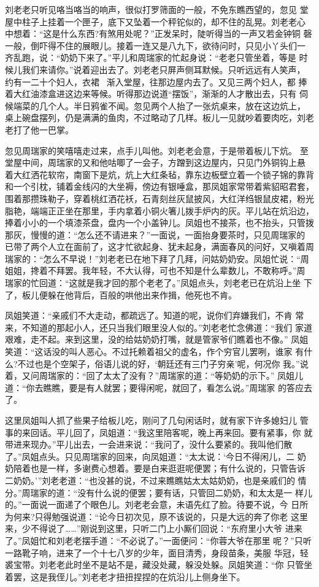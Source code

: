 刘老老只听见咯当咯当的响声，很似打罗筛面的一般，不免东瞧西望的，忽见
堂屋中柱子上挂着一个匣子，底下又坠着一个秤铊似的，却不住的乱晃。刘老老心
中想着：“这是什么东西?有煞用处呢？”正发呆时，陡听得当的一声又若金钟铜
磬一般，倒吓得不住的展眼儿。接着一连又是八九下，欲待问时，只见小丫头们一
齐乱跑，说：“奶奶下来了。”平儿和周瑞家的忙起身说：“老老只管坐着，等是
时候儿我们来请你。”说着迎出去了。刘老老只屏声侧耳默候。只听远远有人笑声，
约有一二十个妇人，衣裙，渐入堂屋，往那边屋内去了。又见三两个妇人，都
捧着大红油漆盒进这边来等候。听得那边说道“摆饭”，渐渐的人才散出去，只有
伺候端菜的几个人。半日鸦雀不闻。忽见两个人抬了一张炕桌来，放在这边炕上，
桌上碗盘摆列，仍是满满的鱼肉，不过略动了几样。板儿一见就吵着要肉吃，刘老
老打了他一巴掌。

忽见周瑞家的笑嘻嘻走过来，点手儿叫他。刘老老会意，于是带着板儿下炕。
至堂屋中间，周瑞家的又和他咕唧了一会子，方蹭到这边屋内，只见门外铜钩上悬
着大红洒花软帘，南窗下是炕，炕上大红条毡，靠东边板壁立着一个锁子锦的靠背
和一个引枕，铺着金线闪的大坐褥，傍边有银唾盒，那凤姐家常带着紫貂昭君套，
围着那攒珠勒子，穿着桃红洒花袄，石青刻丝灰鼠披风，大红洋绉银鼠皮裙，粉光
脂艳，端端正正坐在那里，手内拿着小铜火箸儿拨手炉内的灰。平儿站在炕沿边，
捧着小小的一个填漆茶盘，盘内一个小盖钟儿。凤姐也不接茶，也不抬头，只管拨
那灰，慢慢的道：“怎么还不请进来？”一面说，一面抬身要茶时，只见周瑞家的
已带了两个人立在面前了，这才忙欲起身、犹未起身，满面春风的问好，又嗔着周
瑞家的：“怎么不早说！”刘老老已在地下拜了几拜，问姑奶奶安。凤姐忙说：“周
姐姐，搀着不拜罢。我年轻，不大认得，可也不知是什么辈数儿，不敢称呼。”周
瑞家的忙回道：“这就是我才回的那个老老了。”凤姐点头，刘老老已在炕沿上坐
下了，板儿便躲在他背后，百般的哄他出来作揖，他死也不肯。

凤姐笑道：“亲戚们不大走动，都疏远了。知道的呢，说你们弃嫌我们，不肯
常来，不知道的那起小人，还只当我们眼里没人似的。”刘老老忙念佛道：“我们
家道艰难，走不起。来到这里，没的给姑奶奶打嘴，就是管家爷们瞧着也不像。”
凤姐笑道：“这话没的叫人恶心。不过托赖着祖父的虚名，作个穷官儿罢咧，谁家
有什么?不过也是个空架子，俗语儿说的好，‘朝廷还有三门子穷亲’呢，何况你
我。”说着，又问周瑞家的：“回了太太了没有？”周瑞家的道：“等奶奶的示下。”
凤姐儿道：“你去瞧瞧，要是有人就罢；要得闲呢，就回了，看怎么说。”周瑞家
的答应去了。

这里凤姐叫人抓了些果子给板儿吃，刚问了几句闲话时，就有家下许多媳妇儿
管事的来回话。平儿回了，凤姐道：“我这里陪客呢，晚上再来回。要有紧事，你
就带进来现办。”平儿出去，一会进来说：“我问了，没什么要紧的。我叫他们散
了。”凤姐点头。只见周瑞家的回来，向凤姐道：“太太说：‘今日不得闲儿，二
奶奶陪着也是一样，多谢费心想着。要是白来逛逛呢便罢；有什么说的，只管告诉
二奶奶。’”刘老老道：“也没甚的说，不过来瞧瞧姑太太姑奶奶，也是亲戚们的
情分。”周瑞家的道：“没有什么说的便罢；要有话，只管回二奶奶，和太太是一
样儿的。”一面说一面递了个眼色儿。刘老老会意，未语先红了脸。待要不说，今
日所为何来?只得勉强说道：“论今日初次见，原不该说的，只是大远的奔了你老
这里来，少不得说了……”刚说到这里，只听二门上小厮们回说：“东府里小大爷
进来了。”凤姐忙和刘老老摆手道：“不必说了。”一面便问：“你蓉大爷在那里
呢？”只听一路靴子响，进来了一个十七八岁的少年，面目清秀，身段苗条，美服
华冠，轻裘宝带。刘老老此时坐不是站不是，藏没处藏，躲没处躲。凤姐笑道：“你
只管坐着罢，这是我侄儿。”刘老老才扭扭捏捏的在炕沿儿上侧身坐下。


